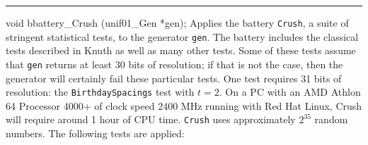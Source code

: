 \hrule
\code


void bbattery_Crush (unif01_Gen *gen);
\endcode
  \tab 
  Applies the battery {\tt Crush}, a suite of stringent statistical
  tests, to the generator {\tt gen}. 
  The battery includes the classical tests described in Knuth \cite{rKNU98a}
  as well as many other tests. Some of these tests assume that
  {\tt gen} returns at least 30 bits of resolution; if that
  is not the case, then the generator will certainly
  fail these particular tests. One test requires 31 bits of resolution:
  the {\tt BirthdaySpacings} test with $t=2$. 
  On a PC with an AMD Athlon 64 Processor 4000+
  of clock speed 2400 MHz running with Red Hat Linux, Crush 
  will require around 1 hour of CPU time. {\tt Crush} uses approximately
  $2^{35}$ random numbers.
  The following tests are applied: \label{bat:Crush}
  \endtab

